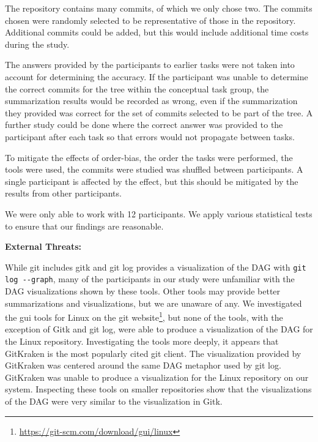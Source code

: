 The repository contains many commits, of which we only chose two. The
commits chosen were randomly selected to be representative of those in
the repository. Additional commits could be added, but this would
include additional time costs during the study.

The answers provided by the participants to earlier tasks were not
taken into account for determining the accuracy. If the participant was
unable to determine the correct commits for the tree within the
conceptual task group, the summarization results would be recorded as
wrong, even if the summarization they provided was correct for the set
of commits selected to be part of the tree. A further study could be
done where the correct answer was provided to the participant after each
task so that errors would not propagate between tasks.

To mitigate the effects of order-bias, the order the tasks were
performed, the tools were used, the commits were studied was shuffled
between participants. A single participant is affected by the effect,
but this should be mitigated by the results from other participants.

We were only able to work with 12 participants. We apply various
statistical tests to ensure that our findings are reasonable.

\textbf{External Threats:}

While git includes gitk and git log provides a visualization of the DAG
with \verb|git log --graph|, many of the participants in our study were
unfamiliar with the DAG visualizations shown by these tools. Other tools
may provide better summarizations and visualizations, but we are unaware
of any. We investigated the gui tools for Linux on the git
website\footnote{\url{https://git-scm.com/download/gui/linux}}, but none
of the tools, with the exception of Gitk and git log, were able to
produce a visualization of the DAG for the Linux repository.
Investigating the tools more deeply, it appears that GitKraken is the
most popularly cited git client. The visualization provided by GitKraken
was centered around the same DAG metaphor used by git log. GitKraken was
unable to produce a visualization for the Linux repository on our
system. Inspecting these tools on smaller repositories show that the
visualizations of the DAG were very similar to the visualization in
Gitk.


